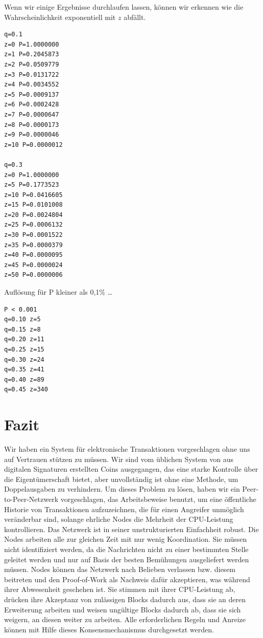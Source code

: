 \documentclass[10pt]{article}
\begin{document}
	\newpage
	
	\noindent Wenn wir einige Ergebnisse durchlaufen lassen, können wir erkennen wie die Wahrscheinlichkeit exponentiell mit $z$ abfällt.
	
	\begin{verbatim}
q=0.1
z=0 P=1.0000000
z=1 P=0.2045873
z=2 P=0.0509779
z=3 P=0.0131722
z=4 P=0.0034552
z=5 P=0.0009137
z=6 P=0.0002428
z=7 P=0.0000647
z=8 P=0.0000173
z=9 P=0.0000046
z=10 P=0.0000012

q=0.3
z=0 P=1.0000000
z=5 P=0.1773523
z=10 P=0.0416605
z=15 P=0.0101008
z=20 P=0.0024804
z=25 P=0.0006132
z=30 P=0.0001522
z=35 P=0.0000379
z=40 P=0.0000095
z=45 P=0.0000024
z=50 P=0.0000006
	\end{verbatim}
	
	\noindent Auflösung für P kleiner als 0,1\% …
	
	\begin{verbatim}
P < 0.001
q=0.10 z=5
q=0.15 z=8
q=0.20 z=11
q=0.25 z=15
q=0.30 z=24
q=0.35 z=41
q=0.40 z=89
q=0.45 z=340
	\end{verbatim}
	
	\section{Fazit}
	
	Wir haben ein System für elektronische Transaktionen vorgeschlagen ohne uns auf Vertrauen stützen zu müssen. Wir sind vom üblichen System von aus digitalen Signaturen erstellten Coins ausgegangen, das eine starke Kontrolle über die Eigentümerschaft bietet, aber unvollständig ist ohne eine Methode, um Doppelausgaben zu verhindern. Um dieses Problem zu lösen, haben wir ein Peer-to-Peer-Netzwerk vorgeschlagen, das Arbeitsbeweise benutzt, um eine öffentliche Historie von Transaktionen aufzuzeichnen, die für einen Angreifer unmöglich veränderbar sind, solange ehrliche Nodes die Mehrheit der CPU-Leistung kontrollieren. Das Netzwerk ist in seiner unstrukturierten Einfachheit robust. Die Nodes arbeiten alle zur gleichen Zeit mit nur wenig Koordination. Sie müssen nicht identifiziert werden, da die Nachrichten nicht zu einer bestimmten Stelle geleitet werden und nur auf Basis der besten Bemühungen ausgeliefert werden müssen. Nodes können das Netzwerk nach Belieben verlassen bzw. diesem beitreten und den Proof-of-Work als Nachweis dafür akzeptieren, was während ihrer Abwesenheit geschehen ist. Sie stimmen mit ihrer CPU-Leistung ab, drücken ihre Akzeptanz von zulässigen Blocks dadurch aus, dass sie an deren Erweiterung arbeiten und weisen ungültige Blocks dadurch ab, dass sie sich weigern, an diesen weiter zu arbeiten. Alle erforderlichen Regeln und Anreize können mit Hilfe dieses Konsensmechanismus durchgesetzt werden.
	
\end{document}
